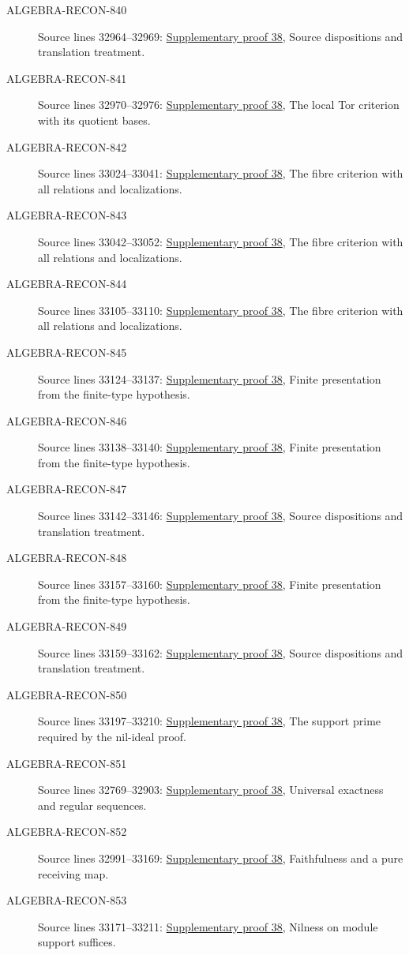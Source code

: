 \begin{description}
\item[ALGEBRA-RECON-840] Source lines 32964--32969: \hyperlink{algebra_more_flatness_notes_20260928}{Supplementary proof 38}, Source dispositions and translation treatment.
\item[ALGEBRA-RECON-841] Source lines 32970--32976: \hyperlink{algebra_more_flatness_notes_20260928}{Supplementary proof 38}, The local Tor criterion with its quotient bases.
\item[ALGEBRA-RECON-842] Source lines 33024--33041: \hyperlink{algebra_more_flatness_notes_20260928}{Supplementary proof 38}, The fibre criterion with all relations and localizations.
\item[ALGEBRA-RECON-843] Source lines 33042--33052: \hyperlink{algebra_more_flatness_notes_20260928}{Supplementary proof 38}, The fibre criterion with all relations and localizations.
\item[ALGEBRA-RECON-844] Source lines 33105--33110: \hyperlink{algebra_more_flatness_notes_20260928}{Supplementary proof 38}, The fibre criterion with all relations and localizations.
\item[ALGEBRA-RECON-845] Source lines 33124--33137: \hyperlink{algebra_more_flatness_notes_20260928}{Supplementary proof 38}, Finite presentation from the finite-type hypothesis.
\item[ALGEBRA-RECON-846] Source lines 33138--33140: \hyperlink{algebra_more_flatness_notes_20260928}{Supplementary proof 38}, Finite presentation from the finite-type hypothesis.
\item[ALGEBRA-RECON-847] Source lines 33142--33146: \hyperlink{algebra_more_flatness_notes_20260928}{Supplementary proof 38}, Source dispositions and translation treatment.
\item[ALGEBRA-RECON-848] Source lines 33157--33160: \hyperlink{algebra_more_flatness_notes_20260928}{Supplementary proof 38}, Finite presentation from the finite-type hypothesis.
\item[ALGEBRA-RECON-849] Source lines 33159--33162: \hyperlink{algebra_more_flatness_notes_20260928}{Supplementary proof 38}, Source dispositions and translation treatment.
\item[ALGEBRA-RECON-850] Source lines 33197--33210: \hyperlink{algebra_more_flatness_notes_20260928}{Supplementary proof 38}, The support prime required by the nil-ideal proof.
\item[ALGEBRA-RECON-851] Source lines 32769--32903: \hyperlink{algebra_more_flatness_notes_20260928}{Supplementary proof 38}, Universal exactness and regular sequences.
\item[ALGEBRA-RECON-852] Source lines 32991--33169: \hyperlink{algebra_more_flatness_notes_20260928}{Supplementary proof 38}, Faithfulness and a pure receiving map.
\item[ALGEBRA-RECON-853] Source lines 33171--33211: \hyperlink{algebra_more_flatness_notes_20260928}{Supplementary proof 38}, Nilness on module support suffices.
\end{description}

